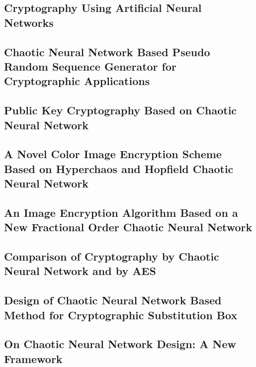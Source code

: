 \documentclass[conference]{IEEEtran}
\begin{document}
\subsection{\textbf{Cryptography Using Artificial Neural Networks}}\label{subsec:cryptography-using-artificial-neural-networks}
\cite{Gujral}

\subsection{\textbf{Chaotic Neural Network Based Pseudo Random Sequence Generator for Cryptographic Applications}}\label{subsec:chaotic-neural-network-based-pseudo-random-sequence-generator-for-cryptographic-applications}
\cite{Lokesh}
\subsection{\textbf{Public Key Cryptography Based on Chaotic Neural Network}}\label{subsec:public-key-cryptography-based-on-chaotic-neural-network}
\cite{Hamdy}
\subsection{\textbf{A Novel Color Image Encryption Scheme Based on Hyperchaos and Hopfield Chaotic Neural Network}}\label{subsec:a-novel-color-image-encryption-scheme-based-on-hyperchaos-and-hopfield-chaotic-neural-network}
\cite{Wu2022}
\subsection{\textbf{An Image Encryption Algorithm Based on a New Fractional Order Chaotic Neural Network}}\label{subsec:an-image-encryption-algorithm-based-on-a-new-fractional-order-chaotic-neural-network}
\cite{Li2022}
\subsection{\textbf{Comparison of Cryptography by Chaotic Neural Network and by AES}}\label{subsec:comparison-of-cryptography-by-chaotic-neural-network-and-by-aes}
\cite{Skovajsova2019}
\subsection{\textbf{Design of Chaotic Neural Network Based Method for Cryptographic Substitution Box}}\label{subsec:design-of-chaotic-neural-network-based-method-for-cryptographic-substitution-box}
\cite{Ahmad2016}
\subsection{\textbf{On Chaotic Neural Network Design: A New Framework}}\label{subsec:on-chaotic-neural-network-design:-a-new-framework}
\cite{Qin2017}
\end{document}
